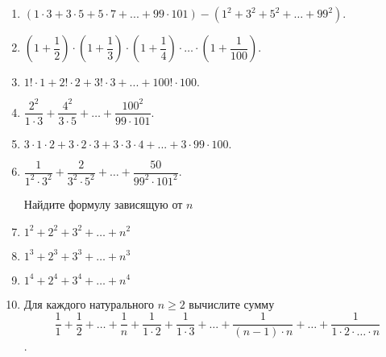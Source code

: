 \documentclass{article}
\begin{document}
\begin{enumerate}[label*=\protect\fbox{\arabic{enumi}}]
	
	\setcounter{enumi}{0}
	
	\item $(1\cdot 3+3\cdot 5+5\cdot 7+...+99\cdot 101) - (1^2+3^2+5^2+ \dotsc +99^2).$
	\item $\left(1+ \dfrac{1}{2}\right) \cdot  \left(1+ \dfrac{1}{3}\right) \cdot  \left(1+ \dfrac{1}{4}\right) \cdot  \dotsc \cdot  \left(1+ \dfrac{1}{100}\right).$
	
	\item $1!\cdot 1 + 2!\cdot 2 + 3!\cdot 3 + ... +100!\cdot 100.$
	
	\item $\dfrac{2^2}{1 \cdot 3} + \dfrac{4^2}{3 \cdot 5} + \dotsc +  \dfrac{100^2}{99 \cdot 101}.$
	
	\item $3\cdot 1\cdot 2 + 3\cdot 2\cdot 3 + 3\cdot 3\cdot 4 + ... +3\cdot 99\cdot 100.$ 
	
	\item $\dfrac{1}{1^2 \cdot 3^2} + \dfrac{2}{3^2 \cdot 5^2} + \dotsc +  \dfrac{50}{99^2 \cdot 101^2}.$
	
	Найдите формулу зависящую от $n$ 
	\item $1^2 + 2^2 + 3^2 + \dotsc +n^2$
	\item $1^3 + 2^3 + 3^3 + \dotsc +n^3$
	\item $1^4 + 2^4 + 3^4 + \dotsc +n^4$
	
	\item Для каждого натурального $n \ge 2$ вычислите сумму $$\dfrac{1}{1} + \dfrac{1}{2} + \dotso +  \dfrac{1}{n} + \dfrac{1}{1 \cdot 2} + \dfrac{1}{1 \cdot 3} + \dotso +  \dfrac{1}{(n-1) \cdot n} + \dotso + \dfrac{1}{1 \cdot 2 \cdot \dotso \cdot n}$$.
	
\end{enumerate}
\end{document}
